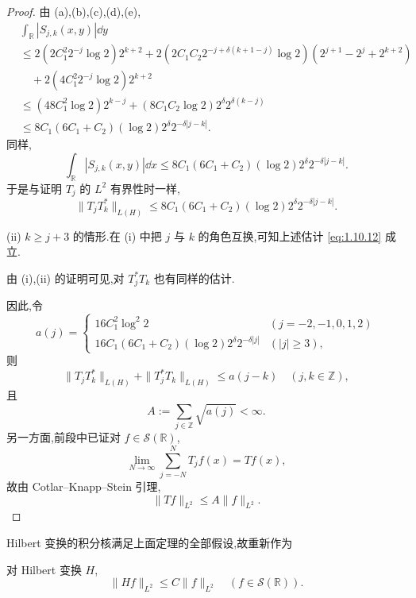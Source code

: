 \begin{proof}
由 (a),(b),(c),(d),(e),
\begin{align*}
& \displaystyle\int_{\mathbb{R}}|S_{j,k}(x, y)|\dd y \\
& \leq 2(2C_{1}^{2}2^{-j}\log 2)2^{k+2} + 2(2C_{1}C_{2}2^{-j+\delta(k+1-j)}\log 2)(2^{j+1} - 2^{j} + 2^{k+2}) \\
& \quad + 2(4C_{1}^{2}2^{-j}\log 2)2^{k+2} \\
& \leq (48C_{1}^{2}\log 2)2^{k-j} + (8C_{1}C_{2}\log 2)2^{\delta}2^{\delta(k-j)} \\
& \leq 8C_{1}(6C_{1} + C_{2})(\log 2)2^{\delta}2^{-\delta|j-k|}.
\end{align*}
同样,
\begin{equation*}
\int_{\mathbb{R}}|S_{j,k}(x, y)|\dd x \leq 8C_{1}(6C_{1} + C_{2})(\log 2)2^{\delta}2^{-\delta|j-k|}.
\end{equation*}
于是与证明 $T_{j}$ 的 $L^{2}$ 有界性时一样,
\begin{equation}\tag{1.10.12}
\| T_{j}T_{k}^{*} \|_{L(H)} \leq 8C_{1}(6C_{1} + C_{2})(\log 2)2^{\delta}2^{-\delta|j-k|}.
\label{eq:1.10.12}\end{equation}

(ii) $k \geq j + 3$ 的情形.在 (i) 中把 $j$ 与 $k$ 的角色互换,可知上述估计 \eqref{eq:1.10.12} 成立.

由 (i),(ii) 的证明可见,对 $T_{j}^{*}T_{k}$ 也有同样的估计.

因此,令
\begin{equation*}
a(j) = \begin{cases} 16C_{1}^{2}\log^{2}2 & (j = -2, -1, 0, 1, 2) \\ 16C_{1}(6C_{1} + C_{2})(\log 2)2^{\delta}2^{-\delta|j|} & (|j| \geq 3), \end{cases}
\end{equation*}
则
\begin{equation*}
\| T_{j}T_{k}^{*} \|_{L(H)} + \| T_{j}^{*}T_{k} \|_{L(H)} \leq a(j - k) \quad (j, k \in \mathbb{Z}),
\end{equation*}
且
\begin{equation*}
A := \sum_{j \in \mathbb{Z}}\sqrt{a(j)} < \infty.
\end{equation*}
另一方面,前段中已证对 $f \in \mathcal{S}(\mathbb{R})$,
\begin{equation*}
\lim_{N \to \infty}\sum_{j = -N}^{N}T_{j}f(x) = Tf(x),
\end{equation*}
故由 Cotlar--Knapp--Stein 引理,
\begin{equation*}
\| Tf \|_{L^{2}} \leq A\| f \|_{L^{2}}.
\end{equation*}
\end{proof}

Hilbert 变换的积分核满足上面定理的全部假设,故重新作为

\begin{corollary}\label{cor:1.10.3}
对 Hilbert 变换 $H$,
\begin{equation*}
\| Hf \|_{L^{2}} \leq C\| f \|_{L^{2}} \quad (f \in \mathcal{S}(\mathbb{R})).
\end{equation*}
\end{corollary}
